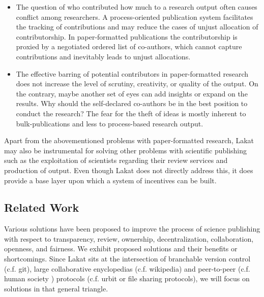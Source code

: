 \documentclass[14pt]{article}
\begin{document}
\begin{itemize}
\item The question of who contributed how much to a research output often causes conflict among researchers. A process-oriented publication system facilitates the tracking of contributions and may reduce the cases of unjust allocation of contributorship. In paper-formatted publications the contributorship is proxied by a negotiated ordered list of co-authors, which cannot capture contributions and inevitably leads to unjust allocations. 

\item The effective barring of potential contributors in paper-formatted research does not increase the level of scrutiny, creativity, or quality of the output. On the contrary, maybe another set of eyes can add insights or expand on the results. Why should the self-declared co-authors be in the best position to conduct the research? The fear for the theft of ideas is mostly inherent to bulk-publications and less to process-based research output. 
\end{itemize}

Apart from the abovementioned problems with paper-formatted research, Lakat may also be instrumental for solving other problems with scientific publishing such as the exploitation of scientists regarding their review services and production of output. Even though Lakat does not directly address this, it does provide a base layer upon which a system of incentives can be built.

\subsection{Related Work}

Various solutions have been proposed to improve the process of science publishing with respect to transparency, review, ownership, decentralization, collaboration, openness, and fairness. We exhibit proposed solutions and their benefits or shortcomings. Since Lakat sits at the intersection of branchable version control (c.f. git\cite{chacon2014pro,git}), large collaborative enyclopedias (c.f. wikipedia\cite{wikipedia}) and peer-to-peer (c.f. human society \cite{decentralizedhumansocieties}) protocols (c.f. urbit \cite{urbit} or file sharing protocols\cite{distributed_file_sharing}), we will focus on solutions in that general triangle.
\end{document}
